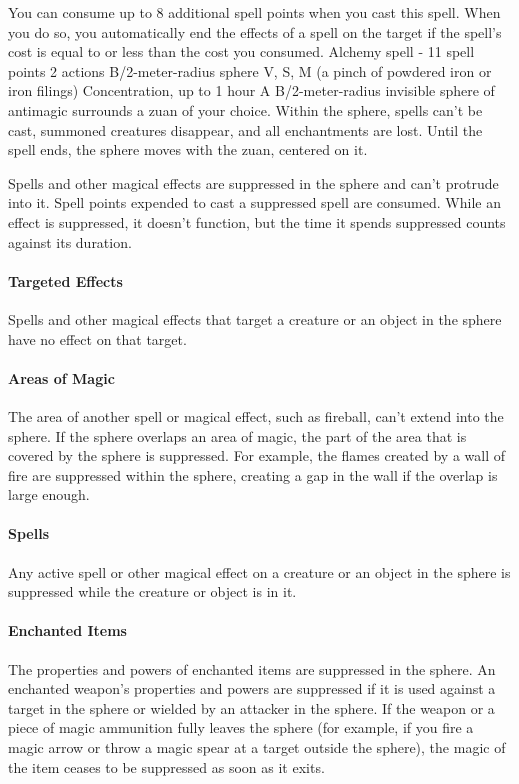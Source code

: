         You can consume up to 8 additional spell points when you cast this spell.
        When you do so, you automatically end the effects of a spell on the target if the spell's cost is equal to or less than the cost you consumed.
        {Alchemy spell - 11 spell points}
        {2 actions}
        {B/2-meter-radius sphere}
        {V, S, M (a pinch of powdered iron or iron filings)}
        {Concentration, up to 1 hour}
        A B/2-meter-radius invisible sphere of antimagic surrounds a zuan of your choice.
        Within the sphere, spells can't be cast, summoned creatures disappear, and all enchantments are lost.
        Until the spell ends, the sphere moves with the zuan, centered on it.

        Spells and other magical effects are suppressed in the sphere and can't protrude into it.
        Spell points expended to cast a suppressed spell are consumed.
        While an effect is suppressed, it doesn't function, but the time it spends suppressed counts against its duration.

        \paragraph{Targeted Effects}
        Spells and other magical effects that target a creature or an object in the sphere have no effect on that target.

        \paragraph{Areas of Magic}
        The area of another spell or magical effect, such as fireball, can't extend into the sphere.
        If the sphere overlaps an area of magic, the part of the area that is covered by the sphere is suppressed.
        For example, the flames created by a wall of fire are suppressed within the sphere, creating a gap in the wall if the overlap is large enough.

        \paragraph{Spells}
        Any active spell or other magical effect on a creature or an object in the sphere is suppressed while the creature or object is in it.

        \paragraph{Enchanted Items}
        The properties and powers of enchanted items are suppressed in the sphere.
        An enchanted weapon's properties and powers are suppressed if it is used against a target in the sphere or wielded by an attacker in the sphere.
        If the weapon or a piece of magic ammunition fully leaves the sphere (for example, if you fire a magic arrow or throw a magic spear at a target outside the sphere), the magic of the item ceases to be suppressed as soon as it exits.

